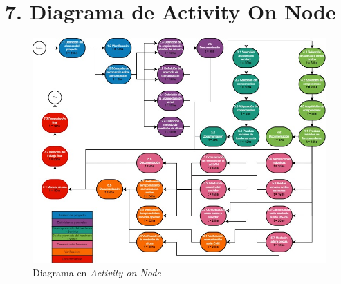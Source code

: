 \documentclass[11pt]{charter}
\begin{document}
\section{7. Diagrama de Activity On Node}
\label{sec:AoN}

\begin{figure}[htpb]
\centering 
\includegraphics[width=\textwidth]{./Figuras/AoN-Plan de Proyecto.jpg}
\caption{Diagrama en \textit{Activity on Node}}
\label{fig:AoN}
\end{figure}
\newpage
\end{document}
